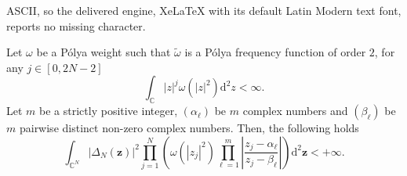 \documentclass[10pt,a4paper]{amsart}
\newcommand{\C}{\mathbb{C}}
\begin{document}
ASCII, so the delivered engine, XeLaTeX with its default Latin Modern text font, reports no missing character.
\begin{lemma}\label{lemma:existence}
    Let $\omega$ be a P\'olya weight such that $\widetilde{\omega}$ is a P\'olya frequency function of order $2$, for any $j\in[0,2N-2]$ 
    \begin{equation}
        \int_{\C}|z|^{j}\omega(|z|^2)\mathrm{d}^2z<\infty.
    \end{equation}
    Let $m$ be a strictly positive integer, $(\alpha_{\ell})$ be $m$ complex numbers and $(\beta_{\ell})$ be $m$ pairwise distinct  non-zero complex numbers.
    Then, the following holds
    \begin{equation}
        \int_{\C^{N}}\left|\Delta_{N}(\mathbf{z})\right|^{2}\prod\limits_{j=1}^{N}\left(\omega(\left|z_{j}\right|^{2})\prod\limits_{\ell=1}^{m}\left|\frac{z_{j}-\alpha_{\ell}}{z_{j}-\beta_{\ell}}\right|\right)\mathrm{d}^{2}\mathbf{z}<+\infty.
    \end{equation}
\end{lemma}
\end{document}
